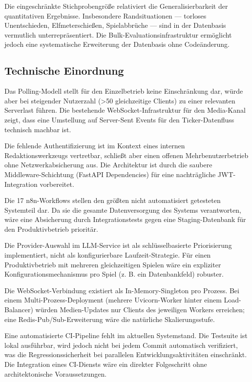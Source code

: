 Die eingeschränkte Stichprobengröße relativiert die Generalisierbarkeit
der quantitativen Ergebnisse. Insbesondere Randsituationen --- torloses
Unentschieden, Elfmeterschießen, Spielabbrüche --- sind in der
Datenbasis vermutlich unterrepräsentiert. Die
Bulk-Evaluationsinfrastruktur ermöglicht jedoch eine systematische
Erweiterung der Datenbasis ohne Codeänderung.

\subsection{Technische Einordnung}\label{technische-einordnung}

Das Polling-Modell stellt für den Einzelbetrieb keine Einschränkung dar, würde aber bei steigender
Nutzerzahl (\textgreater50 gleichzeitige Clients) zu einer relevanten
Serverlast führen. Die bestehende WebSocket-Infrastruktur für den
Media-Kanal zeigt, dass eine Umstellung auf Server-Sent Events für den
Ticker-Datenfluss technisch machbar ist.

Die fehlende Authentifizierung ist im Kontext eines internen
Redaktionswerkzeugs vertretbar, schließt aber einen offenen Mehrbenutzerbetrieb ohne
Netzwerkabsicherung aus. Die Architektur ist durch die saubere
Middleware-Schichtung (FastAPI Dependencies) für eine nachträgliche
JWT-Integration vorbereitet.

Die 17 n8n-Workflows stellen den größten nicht automatisiert getesteten
Systemteil dar. Da sie die gesamte Datenversorgung des Systems
verantworten, wäre eine Absicherung durch Integrationstests gegen eine
Staging-Datenbank für den Produktivbetrieb prioritär.

Die Provider-Auswahl im LLM-Service ist als schlüsselbasierte
Priorisierung implementiert, nicht als konfigurierbare
Laufzeit-Strategie. Für einen Produktivbetrieb mit mehreren
gleichzeitigen Spielen wäre ein expliziter Konfigurationsmechanismus pro
Spiel (z. B. ein Datenbankfeld) robuster.

Die WebSocket-Verbindung existiert als In-Memory-Singleton pro Prozess.
Bei einem Multi-Prozess-Deployment (mehrere Uvicorn-Worker hinter einem
Load-Balancer) würden Medien-Updates nur Clients des jeweiligen Workers
erreichen; eine Redis-Pub/Sub-Erweiterung wäre die natürliche
Skalierungsstufe.

Eine automatisierte CI-Pipeline fehlt im aktuellen Systemstand. Die Testsuite ist lokal ausführbar, wird jedoch nicht bei jedem Commit automatisch verifiziert, was die Regressionssicherheit bei parallelen Entwicklungsaktivitäten einschränkt. Die Integration eines CI-Diensts wäre ein direkter Folgeschritt ohne architektonische Voraussetzungen.

